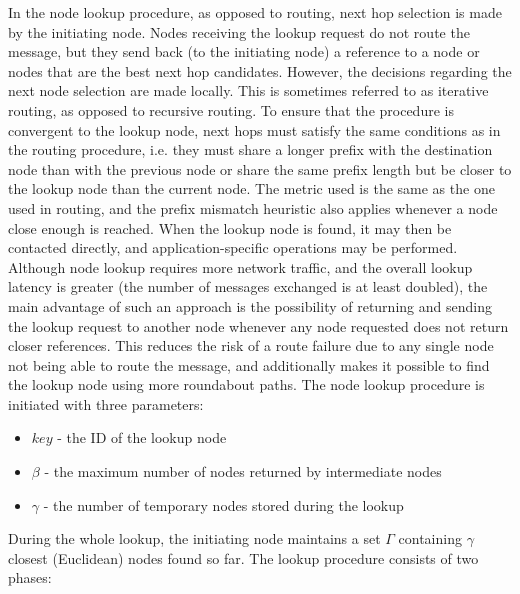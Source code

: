 In the node lookup procedure, as opposed to routing, next hop selection is made by the initiating node. Nodes receiving the lookup request do not route the message, but they send back (to the initiating node) a reference to a node or nodes that are the best next hop candidates. However, the decisions regarding the next node selection are made locally. This is sometimes referred to as iterative routing, as opposed to recursive routing. To ensure that the procedure is convergent to the lookup node, next hops must satisfy the same conditions as in the routing procedure, i.e. they must share a longer prefix with the destination node than with the previous node or share the same prefix length but be closer to the lookup node than the current node. The metric used is the same as the one used in routing, and the prefix mismatch heuristic also applies whenever a node close enough is reached. When the lookup node is found, it may then be contacted directly, and application-specific operations may be performed. Although node lookup requires more network traffic, and the overall lookup latency is greater (the number of messages exchanged is at least doubled), the main advantage of such an approach is the possibility of returning and sending the lookup request to another node whenever any node requested does not return closer references. This reduces the risk of a route failure due to any single node not being able to route the message, and additionally makes it possible to find the lookup node using more roundabout paths. The node lookup procedure is initiated with three parameters:

\begin{itemize}
	\renewcommand{\labelitemi}{$\bullet$}
	\item $key$ - the ID of the lookup node
	\item $\beta$ - the maximum number of nodes returned by intermediate nodes
	\item $\gamma$ - the number of temporary nodes stored during the lookup
\end{itemize}

\smallskip
\noindent
During the whole lookup, the initiating node maintains a set $\Gamma$ containing $\gamma$ closest (Euclidean) nodes found so far. The lookup procedure consists of two phases:

